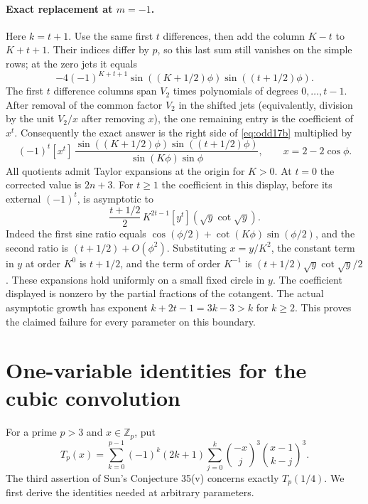\documentclass[11pt,a4paper]{article}
\begin{document}
\paragraph{Exact replacement at $m=-1$.}
Here $k=t+1$. Use the same first $t$ differences, then add the
column $K-t$ to $K+t+1$. Their indices differ by $p$, so this last
sum still vanishes on the simple rows; at the zero jets it equals
\[
 -4(-1)^{K+t+1}\sin((K+1/2)\phi)\sin((t+1/2)\phi).
\]
The first $t$ difference columns span $V_2$ times polynomials
of degrees $0,\ldots,t-1$. After removal of the common factor
$V_2$ in the shifted jets (equivalently, division by the unit
$V_2/x$ after removing $x$), the one remaining entry is the
coefficient of $x^t$. Consequently the exact answer is the
right side of \eqref{eq:odd17b} multiplied by
\[
 (-1)^t [x^t]\,
 \frac{\sin((K+1/2)\phi)\sin((t+1/2)\phi)}{\sin(K\phi)\sin\phi},
 \qquad x=2-2\cos\phi .
\]
All quotients admit Taylor expansions at the origin for $K>0$.
At $t=0$ the corrected value is $2n+3$. For $t\ge1$ the
coefficient in this display, before its external $(-1)^t$, is
asymptotic to
\[
 \frac{t+1/2}{2}\,K^{2t-1}[y^t](\sqrt y\cot\sqrt y).
\]
Indeed the first sine ratio equals
$\cos(\phi/2)+\cot(K\phi)\sin(\phi/2)$, and the second ratio
is $(t+1/2)+O(\phi^2)$. Substituting $x=y/K^2$, the constant
term in $y$ at order $K^0$ is $t+1/2$, and the term of order
$K^{-1}$ is $(t+1/2)\sqrt y\cot\sqrt y/2$.
These expansions hold uniformly on a small fixed circle in $y$.
The coefficient displayed is nonzero by the partial fractions of
the cotangent. The actual asymptotic growth has exponent
$k+2t-1=3k-3>k$ for $k\ge2$. This proves the claimed failure
for every parameter on this boundary.

\section{One-variable identities for the cubic convolution}\label{sec:cubicprime}
For a prime $p>3$ and $x\in\mathbb Z_p$, put
\[
 T_p(x)=\sum_{k=0}^{p-1}(-1)^k(2k+1)\sum_{j=0}^k
          \binom{-x}{j}^{\!3}\binom{x-1}{k-j}^{\!3}.
\]
The third assertion of Sun's Conjecture 35(v) \cite[p.~31]{Sun} concerns exactly $T_p(1/4)$. We first derive the identities needed at arbitrary parameters.
\end{document}
